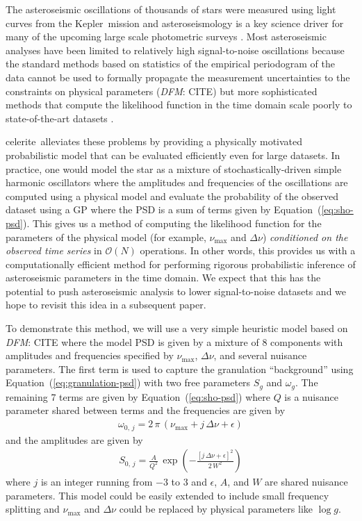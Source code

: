 \documentclass[manuscript, letterpaper]{aastex6}
\newcommand{\project}[1]{\textsf{#1}}
\newcommand{\kepler}{\project{Kepler}}
\newcommand{\celerite}{\project{celerite}}
\renewcommand{\eqref}[1]{\ref{eq:#1}}
\newcommand{\Eq}[1]{Equation~(\eqref{#1})}
\newcommand{\eq}[1]{\Eq{#1}}
\newcommand{\todo}[3]{{\color{#2}\emph{#1}: #3}}
\newcommand{\dfmtodo}[1]{\todo{DFM}{red}{#1}}
\begin{document}
The asteroseismic oscillations of thousands of stars were measured using light
curves from the \kepler\ mission \citep{Gilliland:2010, Chaplin:2011,
Chaplin:2013, Stello:2013} and asteroseismology is a key science driver for
many of the upcoming large scale photometric surveys \citep{Campante:2016,
Rauer:2014, Gould:2015}.
Most asteroseismic analyses have been limited to relatively high
signal-to-noise oscillations because the standard methods based on statistics
of the empirical periodogram of the data cannot be used to formally propagate
the measurement uncertainties to the constraints on physical parameters
(\dfmtodo{CITE}) but more sophisticated methods that compute the likelihood
function in the time domain scale poorly to state-of-the-art datasets
\citep{Brewer:2009,Corsaro:2014}.

\celerite\ alleviates these problems by providing a physically motivated
probabilistic model that can be evaluated efficiently even for large datasets.
In practice, one would model the star as a mixture of stochastically-driven
simple harmonic oscillators where the amplitudes and frequencies of the
oscillations are computed using a physical model and evaluate the probability
of the observed dataset using a GP where the PSD is a sum of terms given by
\eq{sho-psd}.
This gives us a method of computing the likelihood function for the parameters
of the physical model (for example, $\nu_\mathrm{max}$ and $\Delta \nu$)
\emph{conditioned on the observed time series} in $\mathcal{O}(N)$ operations.
In other words, this provides us with a computationally efficient method for
performing rigorous probabilistic inference of asteroseismic parameters in the
time domain.
We expect that this has the potential to push asteroseismic analysis to lower
signal-to-noise datasets and we hope to revisit this idea in a subsequent
paper.

To demonstrate this method, we will use a very simple heuristic model based on
\dfmtodo{CITE} where the model PSD is given by a mixture of 8 components with
amplitudes and frequencies specified by $\nu_\mathrm{max}$, $\Delta \nu$, and
several nuisance parameters.
The first term is used to capture the granulation ``background''
\citep{Kallinger:2014} using \eq{granulation-psd} with two free parameters
$S_g$ and $\omega_g$.
The remaining  7 terms are given by \eq{sho-psd} where $Q$ is a nuisance
parameter shared between terms and the frequencies are given by
\begin{eqnarray}
\omega_{0,\,j} = 2\,\pi\,(\nu_\mathrm{max} + j\,\Delta\nu + \epsilon)
\end{eqnarray}
and the amplitudes are given by
\begin{eqnarray}
S_{0,\,j} =
    \frac{A}{Q^2}\,\exp\left(-\frac{[j\,\Delta\nu + \epsilon]^2}{2\,W^2}\right)
\end{eqnarray}
where $j$ is an integer running from $-3$ to 3 and $\epsilon$, $A$, and $W$
are shared nuisance parameters.
This model could be easily extended to include small frequency splitting and
$\nu_\mathrm{max}$ and $\Delta \nu$ could be replaced by physical parameters
like $\log g$.
\end{document}
